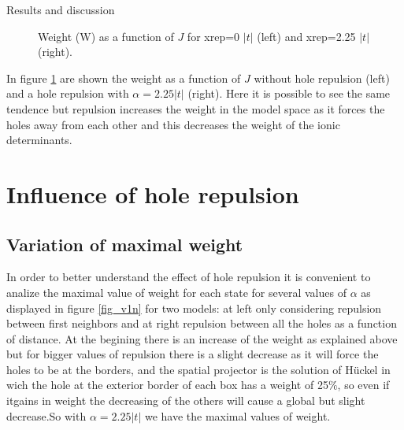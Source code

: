 \documentclass[12pt,twoside]{report}
\begin{document}
\begin{chapter}{Results and discussion}
\begin{figure}[h!]
\begin{minipage}{0.4\textwidth}
		\end{minipage}
		\caption{\label{fig_0_225} Weight (W) as a function of $J$ for xrep=0 $|t|$ (left) and xrep=2.25 $|t|$ (right). }
	\end{figure}
	
	In figure \ref{fig_0_225} are shown the weight as a function of $J$ without hole repulsion (left) and a hole repulsion with $\alpha=2.25|t|$ (right). Here it is possible to see the same tendence but repulsion increases the weight in the model space as it forces the holes away from each other and this decreases the weight of the ionic determinants. 
	
	\section{Influence of hole repulsion}
	\subsection{Variation of maximal weight}
	In order to better understand the effect of hole repulsion it is convenient to analize the maximal value of weight for each state for several values of $\alpha$ as displayed in figure \ref{fig_v1n} for two models: at left only considering repulsion between first neighbors and at right repulsion between all the holes as a function of distance. At the begining there is an increase of the weight as explained above but for bigger values of repulsion there is a slight decrease as it will force the holes to be at the borders, and the spatial projector is the solution of Hückel in wich the hole at the exterior border of each box has a weight of 25$\%$, so even if itgains in weight the decreasing of the others will cause a global but slight decrease.So with $\alpha=2.25|t|$ we have the maximal values of weight.  
	

\end{chapter}
\end{document}
